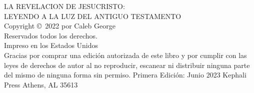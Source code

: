 \pagestyle{empty}
\frontmatter


\titleGM

\clearpage

\begin{vplace}[2]
\noindent
LA REVELACION DE JESUCRISTO: \\LEYENDO A LA LUZ DEL ANTIGUO TESTAMENTO\\
\newline
Copyright \copyright\ 2022 por Caleb George\\
Reservados todos los derechos.\\
\newline
Impreso en los Estados Unidos\\
\newline
Gracias por comprar una edición autorizada de este libro y por cumplir con las leyes de derechos de autor al no reproducir, escanear ni distribuir ninguna parte del mismo de ninguna forma sin permiso.
\newline
\newline
Primera Edición: Junio 2023
\newline
\newline
Kephali Press
\newline
Athens, AL 35613
\end{vplace}

\clearpage
\clearpage

\dedication
\clearpage

